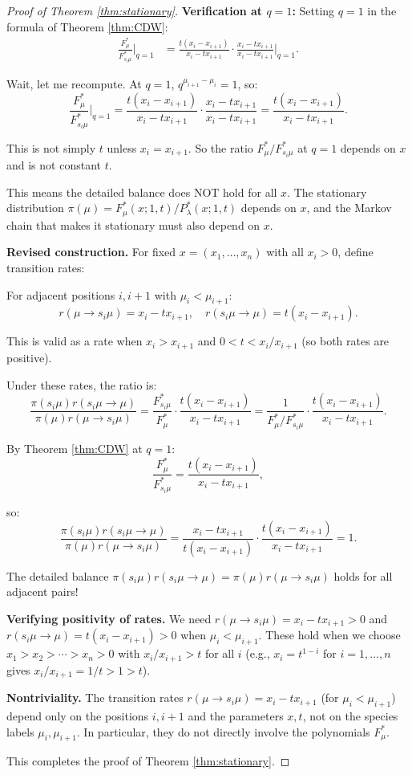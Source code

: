 \documentclass[12pt]{article}
\begin{document}
\begin{proof}[Proof of Theorem \ref{thm:stationary}]
\textbf{Verification at $q=1$:} Setting $q = 1$ in the formula of Theorem \ref{thm:CDW}:
\begin{align*}
\frac{F^*_\mu}{F^*_{s_i\mu}}\bigg|_{q=1} &= \frac{t(x_i - x_{i+1})}{x_i - tx_{i+1}} \cdot \frac{x_i - tx_{i+1}}{x_i - tx_{i+1}}\bigg|_{q=1}.
\end{align*}

Wait, let me recompute. At $q = 1$, $q^{\mu_{i+1}-\mu_i} = 1$, so:
\[
\frac{F^*_\mu}{F^*_{s_i\mu}}\bigg|_{q=1} = \frac{t(x_i - x_{i+1})}{x_i - tx_{i+1}} \cdot \frac{x_i - tx_{i+1}}{x_i - tx_{i+1}} = \frac{t(x_i - x_{i+1})}{x_i - tx_{i+1}}.
\]

This is not simply $t$ unless $x_i = x_{i+1}$. So the ratio $F^*_\mu/F^*_{s_i\mu}$ at $q=1$ depends on $x$ and is not constant $t$.

This means the detailed balance does NOT hold for all $x$. The stationary distribution $\pi(\mu) = F^*_\mu(x;1,t)/P^*_\lambda(x;1,t)$ depends on $x$, and the Markov chain that makes it stationary must also depend on $x$.

\textbf{Revised construction.} For fixed $x = (x_1, \ldots, x_n)$ with all $x_i > 0$, define transition rates:

For adjacent positions $i, i+1$ with $\mu_i < \mu_{i+1}$:
\[
r(\mu \to s_i\mu) = x_i - t x_{i+1}, \quad r(s_i\mu \to \mu) = t(x_i - x_{i+1}).
\]

This is valid as a rate when $x_i > x_{i+1}$ and $0 < t < x_i/x_{i+1}$ (so both rates are positive).

Under these rates, the ratio is:
\[
\frac{\pi(s_i\mu) r(s_i\mu \to \mu)}{\pi(\mu) r(\mu \to s_i\mu)} = \frac{F^*_{s_i\mu}}{F^*_\mu} \cdot \frac{t(x_i - x_{i+1})}{x_i - tx_{i+1}} = \frac{1}{F^*_\mu/F^*_{s_i\mu}} \cdot \frac{t(x_i-x_{i+1})}{x_i - tx_{i+1}}.
\]

By Theorem \ref{thm:CDW} at $q=1$:
\[
\frac{F^*_\mu}{F^*_{s_i\mu}} = \frac{t(x_i - x_{i+1})}{x_i - tx_{i+1}},
\]

so:
\[
\frac{\pi(s_i\mu) r(s_i\mu \to \mu)}{\pi(\mu) r(\mu \to s_i\mu)} = \frac{x_i - tx_{i+1}}{t(x_i-x_{i+1})} \cdot \frac{t(x_i - x_{i+1})}{x_i - tx_{i+1}} = 1.
\]

The detailed balance $\pi(s_i\mu) r(s_i\mu \to \mu) = \pi(\mu) r(\mu \to s_i\mu)$ holds for all adjacent pairs!

\textbf{Verifying positivity of rates.} We need $r(\mu \to s_i\mu) = x_i - tx_{i+1} > 0$ and $r(s_i\mu \to \mu) = t(x_i - x_{i+1}) > 0$ when $\mu_i < \mu_{i+1}$. These hold when we choose $x_1 > x_2 > \cdots > x_n > 0$ with $x_i/x_{i+1} > t$ for all $i$ (e.g., $x_i = t^{1-i}$ for $i = 1, \ldots, n$ gives $x_i/x_{i+1} = 1/t > 1 > t$).

\textbf{Nontriviality.} The transition rates $r(\mu \to s_i\mu) = x_i - tx_{i+1}$ (for $\mu_i < \mu_{i+1}$) depend only on the positions $i, i+1$ and the parameters $x, t$, not on the species labels $\mu_i, \mu_{i+1}$. In particular, they do not directly involve the polynomials $F^*_\mu$.

This completes the proof of Theorem \ref{thm:stationary}.
\end{proof}
\end{document}
